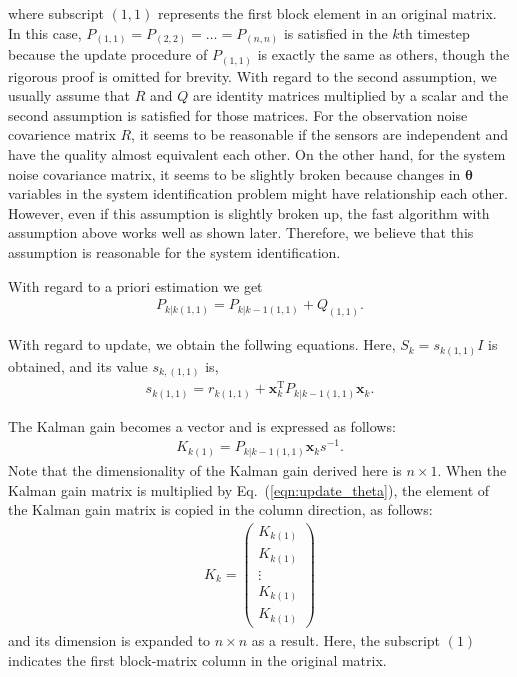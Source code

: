 \documentclass[aip,graphicx]{revtex4-1}
\begin{document}
where subscript $(1,1)$ represents the first block element in an original matrix.
In this case, $P_{(1,1)}=P_{(2,2)}=\dots=P_{(n,n)}$ is satisfied in the $k$th timestep because the update procedure of $P_{(1,1)}$ is exactly the same as others, though the rigorous proof is omitted for brevity. With regard to the second assumption, we usually assume that $R$ and $Q$ are identity matrices multiplied by a scalar and the second assumption is satisfied for those matrices. For the observation noise covarience matrix $R$, it seems to be reasonable if the sensors are independent and have the quality almost equivalent each other. On the other hand, for the system noise covariance matrix, it seems to be slightly broken because changes in $\bm{\theta}$ variables in the system identification problem might have relationship each other. However, even if this assumption is slightly broken up, the fast algorithm with assumption above works well as shown later. Therefore, we believe that this assumption is reasonable for the system identification.

With regard to a priori estimation we get 
\begin{eqnarray}
P_{k|k(1,1)}=P_{k|k-1(1,1)}+Q_{(1,1)} \label{eq:predictP11}.
\end{eqnarray}

With regard to update, we obtain the follwing equations. 
Here, $S_k=s_{k(1,1)} I$ is obtained, and its value $s_{k,(1,1)}$ is,
\begin{eqnarray}
	s_{k(1,1)} = r_{k(1,1)} + \bm{x}_{k}^\text{T}  P_{k|k-1\left(1,1\right)} \bm{x}_{k}.\label{eq:updates}
\end{eqnarray}

The Kalman gain becomes a vector and is expressed as follows:
\begin{eqnarray}
	K_{k\left(1\right)}  = P_{k|k-1\left(1,1\right)} \bm{x}_{k} s^{-1}.
\end{eqnarray}
Note that the dimensionality of the Kalman gain derived here is $n\times 1$.
When the Kalman gain matrix is multiplied by Eq.~(\ref{eqn:update_theta}), 
the element of the Kalman gain matrix is copied in the column direction, as follows:
\begin{eqnarray}
	K_k = \left( 
	\begin{array}{c}
K_{k\left(1\right)}\\
K_{k\left(1\right)}\\
\vdots\\
K_{k\left(1\right)}\\
K_{k\left(1\right)}
\end{array}\right)\label{eq:updatekg}
\end{eqnarray}
and its dimension is expanded to $n\times n$ as a result.
Here, the subscript $(1)$ indicates the first block-matrix column in the original matrix.
\end{document}
